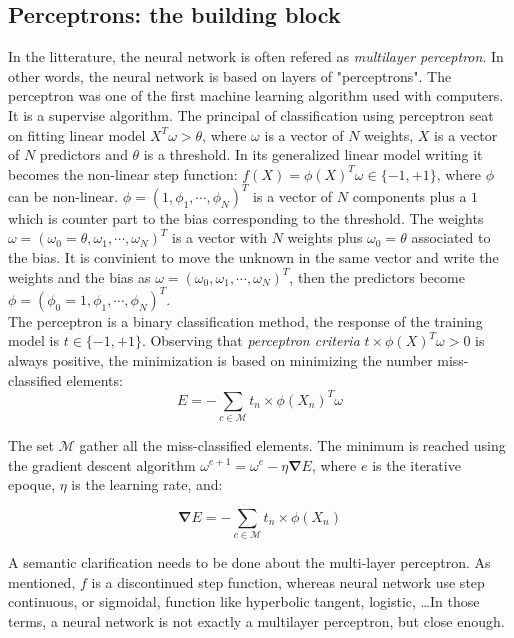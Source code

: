 \documentclass[final, paper=letter,5p,times,twocolumn]{elsarticle}
\begin{document}
\subsection{Perceptrons: the building block}
In the litterature, the neural network is often refered as {\it multilayer perceptron}. In other words, the neural network is based on layers of "perceptrons". The perceptron was one of the first machine learning algorithm used with computers. It is a supervise algorithm. The principal of classification using perceptron seat on fitting linear model $X^{T}\omega > \theta$, where $\omega$ is a vector of $N$ weights, $X$ is a vector of $N$ predictors and $\theta$ is a threshold. In its generalized linear model writing it becomes the non-linear step function: $f(X) = \phi(X)^{T}\omega \in \{-1,+1\}$, where $\phi$ can be non-linear. $\phi = (1, \phi_{1}, \cdots, \phi_{N})^{T}$ is a vector of $N$ components plus a $1$ which is counter part to the bias corresponding to the threshold. The weights $\omega = (\omega_{0} = \theta, \omega_{1}, \cdots, \omega_{N})^{T}$ is a vector with $N$ weights plus $\omega_{0} = \theta$ associated to the bias. It is convinient to move the unknown in the same vector and write the weights and the bias as $\omega = (\omega_{0}, \omega_{1}, \cdots, \omega_{N})^{T}$, then the predictors become $\phi = (\phi_{0} = 1, \phi_{1}, \cdots, \phi_{N})^{T}$. \\
The perceptron is a binary classification method, the response of the training model is $t \in \{-1,+1\}$. Observing that {\it perceptron criteria} $t \times \phi(X)^{T}\omega > 0$ is always positive, the minimization is based on minimizing the number miss-classified elements: \\

\begin{equation}
E = - \sum_{c \in \mathcal{M}} t_{n} \times \phi(X_{n})^{T}\omega
\label{eq:Optimization_perceptron}
\end{equation}

The set $\mathcal{M}$ gather all the miss-classified elements. The minimum is reached using the gradient descent algorithm $\omega^{e+1} = \omega^{e} - \eta \bm{\nabla} E$, where $e$ is the iterative epoque, $\eta$ is the learning rate, and:

$$
\bm{\nabla} E = - \sum_{c \in \mathcal{M}} t_{n} \times \phi(X_{n})
$$

A semantic clarification needs to be done about the multi-layer perceptron. As mentioned, $f$ is a discontinued step function, whereas neural network use step continuous, or sigmoidal, function like hyperbolic tangent, logistic, \dots In those terms, a neural network is not exactly a multilayer perceptron, but close enough.
\end{document}
